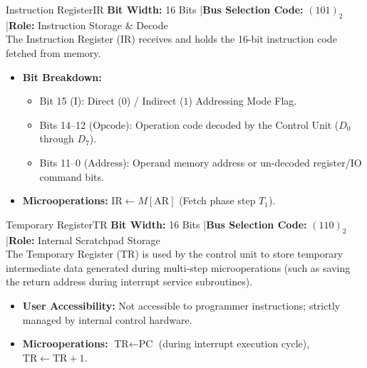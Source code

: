 \documentclass[11pt,a4paper]{article}
\begin{document}
\begin{registerbox}{Instruction Register}{IR}
\textbf{Bit Width:} 16 Bits \quad|\quad \textbf{Bus Selection Code:} $(101)_2$ \quad|\quad \textbf{Role:} Instruction Storage \& Decode\\[0.1cm]
The Instruction Register ($\text{IR}$) receives and holds the 16-bit instruction code fetched from memory.
\begin{itemize}[noitemsep,topsep=2pt]
    \item \textbf{Bit Breakdown:} 
    \begin{itemize}[noitemsep]
        \item Bit 15 ($\text{I}$): Direct ($0$) / Indirect ($1$) Addressing Mode Flag.
        \item Bits 14–12 ($\text{Opcode}$): Operation code decoded by the Control Unit ($D_0$ through $D_7$).
        \item Bits 11–0 ($\text{Address}$): Operand memory address or un-decoded register/IO command bits.
    \end{itemize}
    \item \textbf{Microoperations:} $\text{IR} \leftarrow M[\text{AR}]$ (Fetch phase step $T_1$).
\end{itemize}
\end{registerbox}

\vspace{0.15cm}

\begin{registerbox}{Temporary Register}{TR}
\textbf{Bit Width:} 16 Bits \quad|\quad \textbf{Bus Selection Code:} $(110)_2$ \quad|\quad \textbf{Role:} Internal Scratchpad Storage\\[0.1cm]
The Temporary Register ($\text{TR}$) is used by the control unit to store temporary intermediate data generated during multi-step microoperations (such as saving the return address during interrupt service subroutines).
\begin{itemize}[noitemsep,topsep=2pt]
    \item \textbf{User Accessibility:} Not accessible to programmer instructions; strictly managed by internal control hardware.
    \item \textbf{Microoperations:} $\text{TR} \leftarrow \text{PC}$ (during interrupt execution cycle), $\text{TR} \leftarrow \text{TR} + 1$.
\end{itemize}
\end{registerbox}

\vspace{0.15cm}
\end{document}
